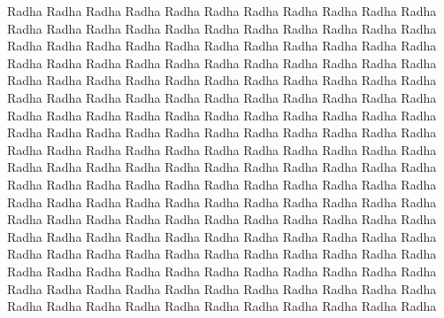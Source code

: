 Radha Radha Radha Radha Radha Radha Radha Radha Radha Radha Radha Radha Radha Radha Radha Radha Radha Radha
Radha Radha Radha Radha Radha Radha Radha Radha Radha Radha Radha Radha Radha Radha Radha Radha Radha Radha
Radha Radha Radha Radha Radha Radha Radha Radha Radha Radha Radha Radha Radha Radha Radha Radha Radha Radha
Radha Radha Radha Radha Radha Radha Radha Radha Radha Radha Radha Radha Radha Radha Radha Radha Radha Radha
Radha Radha Radha Radha Radha Radha Radha Radha Radha Radha Radha Radha Radha Radha Radha Radha Radha Radha
Radha Radha Radha Radha Radha Radha Radha Radha Radha Radha Radha Radha Radha Radha Radha Radha Radha Radha
Radha Radha Radha Radha Radha Radha Radha Radha Radha Radha Radha Radha Radha Radha Radha Radha Radha Radha 
Radha Radha Radha Radha Radha Radha Radha Radha Radha Radha Radha Radha Radha Radha Radha Radha Radha Radha
Radha Radha Radha Radha Radha Radha Radha Radha Radha Radha Radha Radha Radha Radha Radha Radha Radha Radha
Radha Radha Radha Radha Radha Radha Radha Radha Radha Radha Radha Radha Radha Radha Radha Radha Radha Radha
Radha Radha Radha Radha Radha Radha Radha Radha Radha Radha Radha Radha Radha Radha Radha Radha Radha Radha
